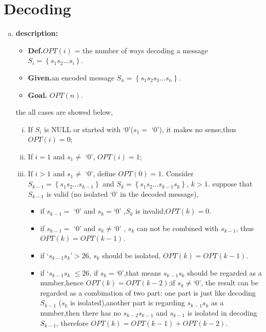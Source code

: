 \section{Decoding}
\begin{enumerate}[a).]
	\item \textbf{description:}
	\begin{itemize}
		\item \textbf{Def.}\qquad$OPT(i)$ = the number of ways decoding a message $S_i=\left\lbrace s_1s_2...s_i\right\rbrace $.
		\item \textbf{Given.}\quad an encoded message $S_n=\left\lbrace s_1s_2s_3...s_n\right\rbrace $.
		\item \textbf{Goal.} \quad $OPT(n)$.
	\end{itemize}
	the all cases are showed below,
	\begin{enumerate}[i.]
		\item If $S_i$ is NULL or started with `$0$'($s_1 =$ `$0$'), it makes no sense,thus $OPT(i) = 0$;
		\item If $i=1$ and $s_1 \neq$ `$0$', $OPT(i) = 1$;
		\item If $i > 1$ and $s_1 \neq$ `$0$', define $OPT(0) =1$.
		Consider $S_{k-1} = \left\lbrace s_1s_2...s_{k-1}\right\rbrace $ and
		 $S_{k} = \left\lbrace s_1s_2...s_{k-1}s_{k}\right\rbrace $, $k > 1$.
		 suppose that $S_{k-1}$ is valid (no isolated `$0$' in the decoded message),
		\begin{itemize}
			\item if $s_{k-1} =$ `$0$' and $s_k=$`$0$' ,$S_k$ is invalid,$OPT(k) = 0$.
			\item if $s_{k-1} =$ `$0$' and $s_k\neq $`$0$' , $s_k$ can not be combined with $s_{k-1}$,
			thus $OPT(k) = OPT(k-1)$.
			\item if `$s_{k-1}s_k$'$>26$, $s_k$ should be isolated,
			$OPT(k) = OPT(k-1)$.
			\item if `$s_{k-1}s_k$ $\leq 26$, if $s_k = $`$0$',that means $s_{k-1}s_{k}$ should be regarded  as
			a number,hence $OPT(k) = OPT(k-2)$;if $s_k \neq $`$0$', the result can be regarded as a combination of two part:
			one part is just like decoding $S_{k-1}$ ($s_k$ is isolated),another part is
			regarding $s_{k-1}s_{k}$ as a number,then there has no $s_{k-2}s_{k-1}$ and $s_{k-1}$ is
			isolated in decoding $S_{k-1}$,
			therefore $OPT(k) = OPT(k-1) + OPT(k-2)$.
		\end{itemize}
		

\end{enumerate}
\end{enumerate}

